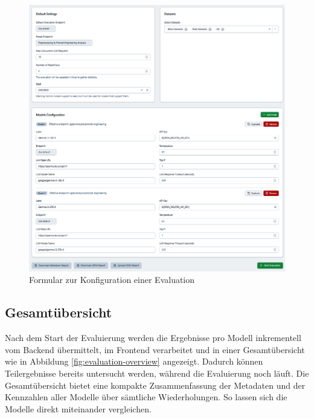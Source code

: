 \begin{figure}[h]
    \centering
    \includegraphics[width=\textwidth]{images/evaluation/evaluation-config_new}
    \caption{Formular zur Konfiguration einer Evaluation}
    \label{fig:evaluation-config}
\end{figure}

\subsection*{Gesamtübersicht}

Nach dem Start der Evaluierung werden die Ergebnisse pro Modell inkrementell vom Backend übermittelt, im Frontend verarbeitet und in einer Gesamtübersicht wie in Abbildung \ref{fig:evaluation-overview} angezeigt. Dadurch können Teilergebnisse bereits untersucht werden, während die Evaluierung noch läuft. Die Gesamtübersicht bietet eine kompakte Zusammenfassung der Metadaten und der Kennzahlen aller Modelle über sämtliche Wiederholungen. So lassen sich die Modelle direkt miteinander vergleichen.

